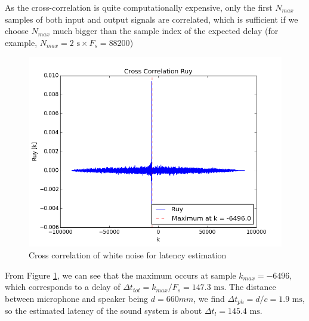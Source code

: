As the cross-correlation is quite computationally expensive, only the first $N_{max}$ samples of both input and output signals are correlated, which is sufficient if we choose $N_{max}$ much bigger than the sample index of the expected delay (for example, $N_{max}=2  \text{ s} \times F_s = 88200$)

\begin{figure}[h!]
	\centering
	\includegraphics[width=0.8\linewidth]{files/audio_ruy.png}
	\caption{Cross correlation of white noise for latency estimation}
	\label{fig:audio_ruy}
\end{figure}

From Figure \ref{fig:audio_ruy}, we can see that the maximum occurs at sample $k_{max}=-6496$, which corresponds to a delay of $\Delta t_{tot}=k_{max}/F_s=147.3 \text{ ms}$. The distance between microphone and speaker being $d=660mm$, we find $\Delta t_{ph} = d/c=1.9  \text{ ms}$, so the estimated latency of the sound system is about $\Delta t_{l}=145.4 \text{ ms}$.

